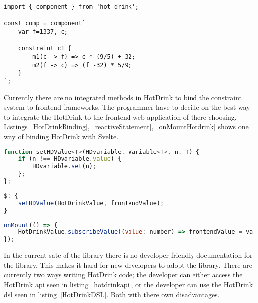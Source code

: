 \begin{lstlisting}[caption={Example of the HotDrink \gls{dsl}},label=HotDrinkDSL, language=hotdrink]
import { component } from 'hot-drink';

const comp = component`
    var f=1337, c;

    constraint c1 {
        m1(c -> f) => c * (9/5) + 32;
        m2(f -> c) => (f -32) * 5/9;
    }
`;
\end{lstlisting}

Currently there are no integrated methods in HotDrink to bind the constraint system to frontend frameworks. The programmer have to decide on the best way to integrate the HotDrink to the frontend web application of there choosing. Listings~\ref{HotDrinkBinding},~\ref{reactiveStatement},~\ref{onMountHotdrink} shows one way of binding HotDrink with Svelte.

\begin{lstlisting}[caption={Function for binding HotDrink and Svelte variable},label=HotDrinkBinding, language=javascript]
function setHDValue<T>(HDvariable: Variable<T>, n: T) {
    if (n !== HDvariable.value) { 
        HDvariable.set(n);
    };
};
\end{lstlisting}

\begin{lstlisting}[caption={Using the reactive statement, in Svelte~\cite{sveltedocs}, to update HotDrink corresopnding value, and trigger HotDrink to enforce the constraint system},label=reactiveStatement, language=javascript]
$: {
    setHDValue(HotDrinkValue, frontendValue);
}
\end{lstlisting}

\begin{lstlisting}[caption={Using the onMount callback, in Svelte~\cite{sveltedocs}, to update the frontend value that correspont to the same value in HotDrink, when the HotDrink value changes.},label=onMountHotdrink, language=javascript]
onMount(() => {
    HotDrinkValue.subscribeValue((value: number) => frontendValue = value);
});
\end{lstlisting}

In the current sate of the library there is no developer friendly documentation for the library. This makes it hard for new developers to adopt the library. There are currently two ways writing HotDrink code; the developer can either access the HotDrink \gls{api} seen in listing~\ref{hotdrinkapi}, or the developer can use the HotDrink \gls{dsl} seen in listing~\ref{HotDrinkDSL}. Both with there own disadvantages. 

